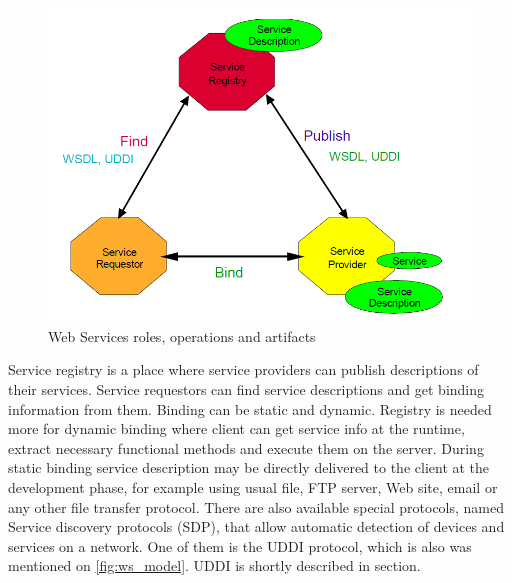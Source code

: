 \begin{center}
 \begin{figure}[H]
	\includegraphics[width=\textwidth]{../images/preliminaries/ws_model.png}
	\caption{Web Services roles, operations and artifacts \cite{Kreger2001-WSC}}
	\label{fig:ws_model}
 \end{figure}
\end{center}

Service registry is a place where service providers can publish
descriptions of their services. Service requestors can find service descriptions
and get binding information from them. Binding can be static and dynamic.
Registry is needed more for dynamic binding where client can get service info at
the runtime, extract necessary functional methods and execute them on the
server. During static binding service description may be directly delivered to
the client at the development phase, for example using usual file, \gls{FTP}
server, Web site, email or any other file transfer protocol.
There are also available special protocols, named Service discovery protocols
(SDP), that allow automatic detection of devices and services on a network. One
of them is the \gls{UDDI} protocol, which is also was mentioned on
\autoref{fig:ws_model}. \gls{UDDI} is shortly described in
 section.

